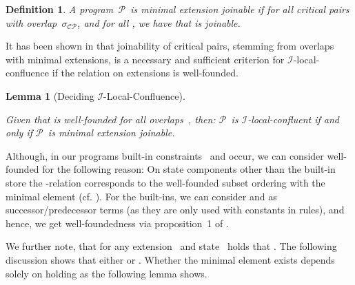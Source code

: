\documentclass{tlp}
\newtheorem{lemma}[theorem]{Lemma}
\newtheorem{definition}{Definition}[section]
\newcommand{\mcCP}{\ensuremath{\mathcal{CP}}}
\newcommand{\mcI}{\ensuremath{\mathcal{I}}}
\newcommand{\mcP}{\ensuremath{\mathcal{P}}}
\newcommand{\sigcp}{\ensuremath{\sigma_{\mcCP}}}
\begin{document}
\begin{definition}

A program~\mcP\ is \emph{minimal extension joinable} if for all critical pairs
 with overlap~\sigcp, and for all , we have that  is joinable.
\end{definition}

It has been shown in \cite{duckstuckeysulzmann07} that joinability of critical
pairs, stemming from overlaps with minimal extensions, is a necessary and
sufficient criterion for \mcI-local-confluence if the relation on extensions is
well-founded.

\begin{lemma}[Deciding \mcI-Local-Confluence]\label{lem:obs_confl}

Given that  is well-founded for all overlaps~, then:
\mcP\ is \mcI-local-confluent if and only if \mcP\ is minimal extension joinable.
\end{lemma}

Although, in our programs built-in constraints~ and  occur, we can
consider  well-founded for the following reason: On state
components other than the built-in store the -relation
corresponds to the well-founded subset ordering with the minimal element
 (cf. \cite{duckstuckeysulzmann07}). For the built-ins, we can
consider  and  as successor/predecessor terms (as they are only used
with constants in rules), and hence, we get well-foundedness via proposition~1 of
\cite{duckstuckeysulzmann07}. 

We further note, that for any extension~ and state~ holds that
. The following discussion shows that
either  or . Whether the minimal element  exists depends
solely on  holding as the following lemma shows.
\end{document}

